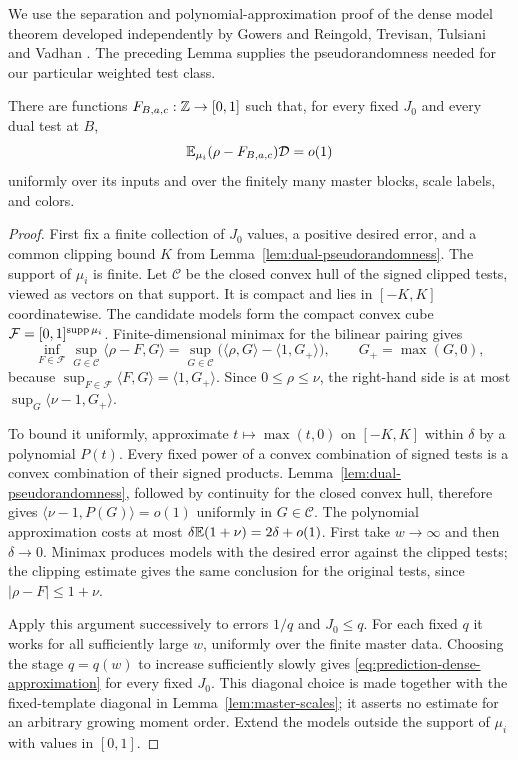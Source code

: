We use the separation and polynomial-approximation proof of the dense
model theorem developed independently by Gowers
\cite[Section~4]{GowersDense} and Reingold, Trevisan, Tulsiani and
Vadhan \cite[Section~2]{RTTVDense}.
The preceding Lemma supplies the pseudorandomness needed for our
particular weighted test class.

\begin{proposition}\label{prop:dense-model}
There are functions $F_{B,a,c}:\mathbb Z\to[0,1]$ such that, for every fixed
$J_0$ and every dual test at $B$,
\begin{equation}\label{eq:prediction-dense-approximation}
 \mathbb E_{\mu_i}(\rho-F_{B,a,c})\mathcal D=o(1)
\end{equation}
uniformly over its inputs and over the finitely many master blocks,
scale labels, and colors.
\end{proposition}

\begin{proof}
First fix a finite collection of $J_0$ values, a positive desired error,
and a common clipping bound $K$ from
Lemma~\ref{lem:dual-pseudorandomness}.  The support of $\mu_i$ is finite.
Let $\mathcal C$ be the closed convex hull of the signed clipped tests,
viewed as vectors on that support.  It is compact and lies in $[-K,K]$
coordinatewise.  The candidate models form the compact convex cube
$\mathcal F=[0,1]^{\operatorname{supp}\mu_i}$.  Finite-dimensional minimax for the
bilinear pairing gives
\[
 \inf_{F\in\mathcal F}\sup_{G\in\mathcal C}\langle\rho-F,G\rangle
 =\sup_{G\in\mathcal C}
 \bigl(\langle\rho,G\rangle-\langle1,G_+\rangle\bigr),
 \qquad G_+=\max(G,0),
\]
because $\sup_{F\in\mathcal F}\langle F,G\rangle=\langle1,G_+\rangle$.
Since $0\leq\rho\leq\nu$, the right-hand side is at most
$\sup_G\langle\nu-1,G_+\rangle$.

To bound it uniformly, approximate $t\mapsto\max(t,0)$ on $[-K,K]$
within $\delta$ by a polynomial $P(t)$.  Every fixed power of a convex
combination of signed tests is a convex combination of their signed
products.  Lemma~\ref{lem:dual-pseudorandomness}, followed by continuity
for the closed convex hull, therefore gives
$\langle\nu-1,P(G)\rangle=o(1)$ uniformly in $G\in\mathcal C$.  The
polynomial approximation costs at most
$\delta\mathbb E(1+\nu)=2\delta+o(1)$.  First take $w\to\infty$ and then
$\delta\to0$.  Minimax produces models with the desired error against
the clipped tests; the clipping estimate gives the same conclusion for
the original tests, since $|\rho-F|\leq1+\nu$.

Apply this argument successively to errors $1/q$ and $J_0\leq q$.
For each fixed $q$ it works for all sufficiently large $w$, uniformly
over the finite master data.  Choosing the stage $q=q(w)$ to increase
sufficiently slowly gives \eqref{eq:prediction-dense-approximation}
for every fixed $J_0$.  This diagonal choice is made together with the
fixed-template diagonal in Lemma~\ref{lem:master-scales}; it asserts no
estimate for an arbitrary growing moment order.  Extend the models
outside the support of $\mu_i$ with values in $[0,1]$.
\end{proof}

